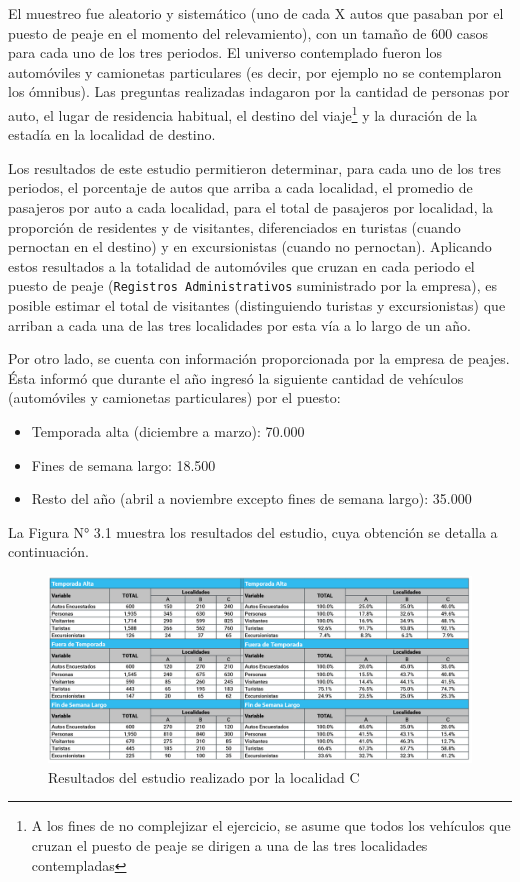 \documentclass[
]{book}
\begin{document}
El muestreo fue aleatorio y sistemático (uno de cada X autos que pasaban por el puesto de peaje en el momento del relevamiento), con un tamaño de 600 casos para cada uno de los tres periodos. El universo contemplado fueron los automóviles y camionetas particulares (es decir, por ejemplo no se contemplaron los ómnibus). Las preguntas realizadas indagaron por la cantidad de personas por auto, el lugar de residencia habitual, el destino del viaje\footnote{A los fines de no complejizar el ejercicio, se asume que todos los vehículos que cruzan el puesto de peaje se dirigen a una de las tres localidades contempladas} y la duración de la estadía en la localidad de destino.

Los resultados de este estudio permitieron determinar, para cada uno de los tres periodos, el porcentaje de autos que arriba a cada localidad, el promedio de pasajeros por auto a cada localidad, para el total de pasajeros por localidad, la proporción de residentes y de visitantes, diferenciados en turistas (cuando pernoctan en el destino) y en excursionistas (cuando no pernoctan). Aplicando estos resultados a la totalidad de automóviles que cruzan en cada periodo el puesto de peaje (\texttt{Registros\ Administrativos} suministrado por la empresa), es posible estimar el total de visitantes (distinguiendo turistas y excursionistas) que arriban a cada una de las tres localidades por esta vía a lo largo de un año.

Por otro lado, se cuenta con información proporcionada por la empresa de peajes. Ésta informó que durante el año ingresó la siguiente cantidad de vehículos (automóviles y camionetas particulares) por el puesto:

\begin{itemize}
\item
  Temporada alta (diciembre a marzo): 70.000
\item
  Fines de semana largo: 18.500
\item
  Resto del año (abril a noviembre excepto fines de semana largo): 35.000
\end{itemize}

La Figura N° 3.1 muestra los resultados del estudio, cuya obtención se detalla a continuación.

\begin{figure}

{\centering \includegraphics[width=0.8\linewidth]{imagenes/figura04} 

}

\caption{Resultados del estudio realizado por la localidad C}\label{fig:estudioslocalidade}
\end{figure}
\end{document}

